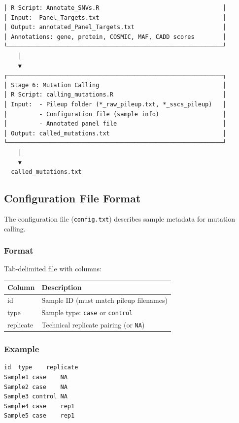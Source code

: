 \documentclass[
]{article}
\newcounter{none} %
\begin{document}
\begin{verbatim}
│ R Script: Annotate_SNVs.R                                   │
│ Input:  Panel_Targets.txt                                   │
│ Output: annotated_Panel_Targets.txt                         │
│ Annotations: gene, protein, COSMIC, MAF, CADD scores        │
└─────────────────────────────────────────────────────────────┘
    │
    ▼
┌─────────────────────────────────────────────────────────────┐
│ Stage 6: Mutation Calling                                   │
│ R Script: calling_mutations.R                               │
│ Input:  - Pileup folder (*_raw_pileup.txt, *_sscs_pileup)   │
│         - Configuration file (sample info)                  │
│         - Annotated panel file                              │
│ Output: called_mutations.txt                                │
└─────────────────────────────────────────────────────────────┘
    │
    ▼
  called_mutations.txt
\end{verbatim}

\subsection{Configuration File Format}\label{configuration-file-format}

The configuration file (\texttt{config.txt}) describes sample metadata
for mutation calling.

\subsubsection{Format}\label{format}

Tab-delimited file with columns:

{\def\LTcaptype{none} %
\begin{longtable}[]{@{}ll@{}}
\toprule\noalign{}
Column & Description \\
\midrule\noalign{}
\endhead
\bottomrule\noalign{}
\endlastfoot
id & Sample ID (must match pileup filenames) \\
type & Sample type: \texttt{case} or \texttt{control} \\
replicate & Technical replicate pairing (or \texttt{NA}) \\
\end{longtable}
}

\subsubsection{Example}\label{example}

\begin{verbatim}
id  type    replicate
Sample1 case    NA
Sample2 case    NA
Sample3 control NA
Sample4 case    rep1
Sample5 case    rep1
\end{verbatim}
\end{document}
